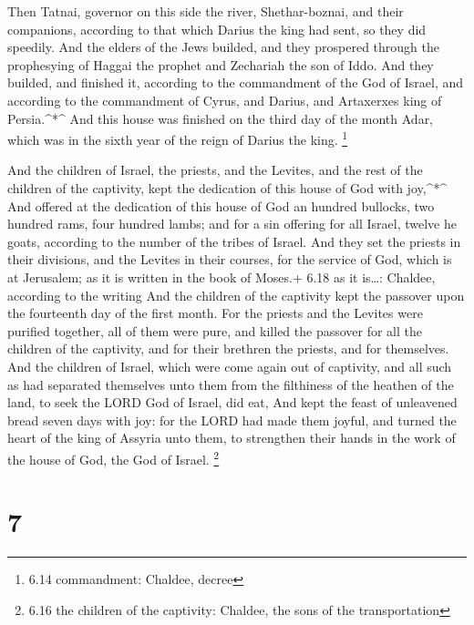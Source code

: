  Then Tatnai, governor on this side the river,
Shethar-boznai, and their companions, according to that which Darius the
king had sent, so they did speedily.  And the elders of the
Jews builded, and they prospered through the prophesying of Haggai the
prophet and Zechariah the son of Iddo. And they builded, and finished
it, according to the commandment of the God of Israel, and according to
the commandment of Cyrus, and Darius, and Artaxerxes king of
Persia.\^{}*\^{}  And this house was finished on the third
day of the month Adar, which was in the sixth year of the reign of
Darius the king. \footnote{6.14 commandment: Chaldee, decree}

 And the children of Israel, the priests, and the Levites,
and the rest of the children of the captivity, kept the dedication of
this house of God with joy,\^{}*\^{}  And offered at the
dedication of this house of God an hundred bullocks, two hundred rams,
four hundred lambs; and for a sin offering for all Israel, twelve he
goats, according to the number of the tribes of Israel. 
And they set the priests in their divisions, and the Levites in their
courses, for the service of God, which is at Jerusalem; as it is written
in the book of Moses.+ 6.18 as it is\ldots: Chaldee, according to the
writing  And the children of the captivity kept the
passover upon the fourteenth day of the first month.  For
the priests and the Levites were purified together, all of them were
pure, and killed the passover for all the children of the captivity, and
for their brethren the priests, and for themselves.  And
the children of Israel, which were come again out of captivity, and all
such as had separated themselves unto them from the filthiness of the
heathen of the land, to seek the LORD God of Israel, did eat,
 And kept the feast of unleavened bread seven days with
joy: for the LORD had made them joyful, and turned the heart of the king
of Assyria unto them, to strengthen their hands in the work of the house
of God, the God of Israel. \footnote{6.16 the children of the captivity:
  Chaldee, the sons of the transportation}

\hypertarget{section-6}{%
\section{7}\label{section-6}}

